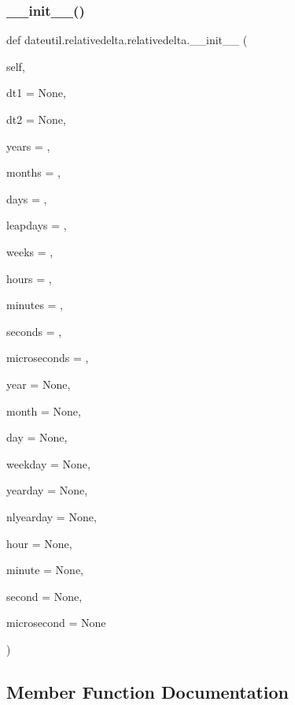 \subsubsection{\texorpdfstring{\+\_\+\+\_\+init\+\_\+\+\_\+()}{\_\_init\_\_()}}
{\footnotesize\ttfamily def dateutil.\+relativedelta.\+relativedelta.\+\_\+\+\_\+init\+\_\+\+\_\+ (\begin{DoxyParamCaption}\item[{}]{self,  }\item[{}]{dt1 = {\ttfamily None},  }\item[{}]{dt2 = {\ttfamily None},  }\item[{}]{years = {},  }\item[{}]{months = {},  }\item[{}]{days = {},  }\item[{}]{leapdays = {},  }\item[{}]{weeks = {},  }\item[{}]{hours = {},  }\item[{}]{minutes = {},  }\item[{}]{seconds = {},  }\item[{}]{microseconds = {},  }\item[{}]{year = {\ttfamily None},  }\item[{}]{month = {\ttfamily None},  }\item[{}]{day = {\ttfamily None},  }\item[{}]{weekday = {\ttfamily None},  }\item[{}]{yearday = {\ttfamily None},  }\item[{}]{nlyearday = {\ttfamily None},  }\item[{}]{hour = {\ttfamily None},  }\item[{}]{minute = {\ttfamily None},  }\item[{}]{second = {\ttfamily None},  }\item[{}]{microsecond = {\ttfamily None} }\end{DoxyParamCaption})}



\subsection{Member Function Documentation}
\mbox{\label{classdateutil_1_1relativedelta_1_1relativedelta_ac52ece7848b642ec9cd0de794e0a64d0}} 
